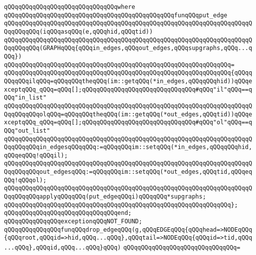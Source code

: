 \verb|qQQqqQQqqQQqqQQqqQQqqQQqqQQqqQQqwhere|\newline
\verb|qQQqqQQqqQQqqQQqqQQqqQQqqQQqqQQqqQQqqQQqqQQqqQQqfunqQQqput_edge|\newline
\verb|qQQqqQQqqQQqqQQqqQQqqQQqqQQqqQQqqQQqqQQqqQQqqQQqqQQqqQQqqQQqqQQqqQQqqQQqqQQqqQQq(iqQQqasqQQq(e,qQQqhid,qQQqtid))|\newline
\verb|qQQqqQQqqQQqqQQqqQQqqQQqqQQqqQQqqQQqqQQqqQQqqQQqqQQqqQQqqQQqqQQqqQQqqQQqqQQqqQQq(GRAPHqQQq{qQQqin_edges,qQQqout_edges,qQQqsupgraphs,qQQq...qQQq})|\newline
\verb|qQQqqQQqqQQqqQQqqQQqqQQqqQQqqQQqqQQqqQQqqQQqqQQqqQQqqQQqqQQqqQQq=|\newline
\verb|qQQqqQQqqQQqqQQqqQQqqQQqqQQqqQQqqQQqqQQqqQQqqQQqqQQqqQQqqQQqqQQq{qQQqqQQqqQQqilqQQq=qQQqqQQqtheqQQq(im::getqQQq(*in_edges,qQQqqQQqhid))qQQqexceptqQQq_qQQq=qQQq[];qQQqqQQqqQQqqQQqqQQqqQQqqQQqqQQq#qQQq"il"qQQq==qQQq"in_list"|\newline
\verb|qQQqqQQqqQQqqQQqqQQqqQQqqQQqqQQqqQQqqQQqqQQqqQQqqQQqqQQqqQQqqQQqqQQqqQQqqQQqqQQqolqQQq=qQQqqQQqtheqQQq(im::getqQQq(*out_edges,qQQqtid))qQQqexceptqQQq_qQQq=qQQq[];qQQqqQQqqQQqqQQqqQQqqQQqqQQqqQQq#qQQq"ol"qQQq==qQQq"out_list"|\newline
\newline
\verb|qQQqqQQqqQQqqQQqqQQqqQQqqQQqqQQqqQQqqQQqqQQqqQQqqQQqqQQqqQQqqQQqqQQqqQQqqQQqqQQqin_edgesqQQqqQQq:=qQQqqQQqim::setqQQq(*in_edges,qQQqqQQqhid,qQQqeqQQq!qQQqil);|\newline
\verb|qQQqqQQqqQQqqQQqqQQqqQQqqQQqqQQqqQQqqQQqqQQqqQQqqQQqqQQqqQQqqQQqqQQqqQQqqQQqqQQqout_edgesqQQq:=qQQqqQQqim::setqQQq(*out_edges,qQQqtid,qQQqeqQQq!qQQqol);|\newline
\newline
\verb|qQQqqQQqqQQqqQQqqQQqqQQqqQQqqQQqqQQqqQQqqQQqqQQqqQQqqQQqqQQqqQQqqQQqqQQqqQQqqQQqapplyqQQqqQQq(put_edgeqQQqi)qQQqqQQq*supgraphs;|\newline
\verb|qQQqqQQqqQQqqQQqqQQqqQQqqQQqqQQqqQQqqQQqqQQqqQQqqQQqqQQqqQQqqQQq};|\newline
\verb|qQQqqQQqqQQqqQQqqQQqqQQqqQQqqQQqend;|\newline
\newline
\verb|qQQqqQQqqQQqqQQqexceptionqQQqNOT_FOUND;|\newline
\newline
\verb|qQQqqQQqqQQqqQQqfunqQQqdrop_edgeqQQq(g,qQQqEDGEqQQq{qQQqhead=>NODEqQQq{qQQqroot,qQQqid=>hid,qQQq...qQQq},qQQqtail=>NODEqQQq{qQQqid=>tid,qQQq...qQQq},qQQqid,qQQq...qQQq}qQQq)|\newline
\verb|qQQqqQQqqQQqqQQqqQQqqQQqqQQqqQQq=|\newline
